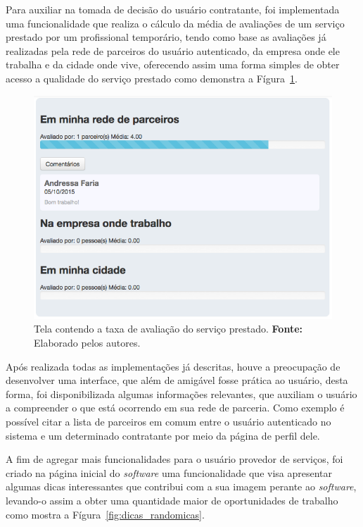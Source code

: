 \par Para auxiliar na tomada de decisão do usuário contratante, foi implementada uma funcionalidade que realiza o cálculo da média de avaliações de um serviço prestado por um profissional temporário, tendo como base as avaliações já realizadas pela rede de parceiros do usuário autenticado, da empresa onde ele trabalha e da cidade onde vive, oferecendo assim uma forma simples de obter acesso a qualidade do serviço prestado como demonstra a Fígura~\ref{fig:taxa_avaliacao}.

\newpage
\begin{figure}[h!]
	\centerline{\includegraphics[scale=0.45]{./imagens/taxa-avaliacao.png}}
	\caption[Tela contendo a taxa de avaliação do serviço prestado.]
	{Tela contendo a taxa de avaliação do serviço prestado. \textbf{Fonte:} Elaborado pelos autores.}
	\label{fig:taxa_avaliacao}
\end{figure}

\par Após realizada todas as implementações já descritas, houve a preocupação de desenvolver uma interface, que além de amigável fosse prática ao usuário, desta forma, foi disponibilizada algumas informações relevantes, que auxiliam o usuário a compreender o que está ocorrendo em sua rede de parceria. Como exemplo é possível citar a lista de parceiros em comum entre o usuário autenticado no sistema e um determinado contratante por meio da página de perfil dele.

\par A fim de agregar mais funcionalidades para o usuário provedor de serviços, foi criado na página inicial do \textit{software} uma funcionalidade que visa apresentar algumas dicas interessantes que contribui com a sua imagem perante ao \textit{software}, levando-o assim a obter uma quantidade maior de oportunidades de trabalho como mostra a Fígura~\ref{fig:dicas_randomicas}.

